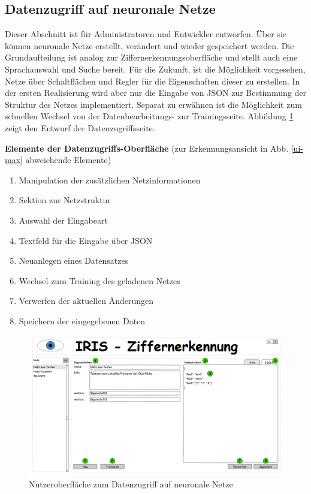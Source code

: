 \subsection{Datenzugriff auf neuronale Netze}
Dieser Abschnitt ist für Administratoren und Entwickler entworfen. Über sie können neuronale Netze erstellt, verändert und wieder gespeichert werden. Die Grundaufteilung ist analog zur Ziffernerkennungsoberfläche und stellt auch eine Sprachauswahl und Suche bereit. Für die Zukunft, ist die Möglichkeit vorgesehen, Netze über Schaltflächen und Regler für die Eigenschaften dieser zu erstellen. In der ersten Realisierung wird aber nur die Eingabe von JSON zur Bestimmung der Struktur des Netzes implementiert. Separat zu erwähnen ist die Möglichkeit zum schnellen Wechsel von der  Datenbearbeitungs- zur Trainingsseite. Abbildung \ref{ui-crud} zeigt den Entwurf der Datenzugriffsseite.

 \textbf{Elemente der Datenzugriffs-Oberfläche} (zur Erkennungsansicht in Abb. \ref{ui-max} abweichende Elemente)
 \begin{enumerate}
 	\item Manipulation der zusätzlichen Netzinformationen
 	\item Sektion zur Netzstruktur
 	\item Auswahl der Eingabeart
 	\item Textfeld für die Eingabe über JSON
 	\item Neuanlegen eines Datensatzes
 	\item Wechsel zum Training des geladenen Netzes
 	\item Verwerfen der aktuellen Änderungen
 	\item Speichern der eingegebenen Daten
 \end{enumerate}

\begin{figure}[H]
	\centering
	\includegraphics[width=1\textwidth]{Abbildungen/UI-Mocks/CRUD-Ui.png}
	\caption{Nutzeroberfläche zum Datenzugriff auf neuronale Netze}
	\label{ui-crud}
\end{figure}

